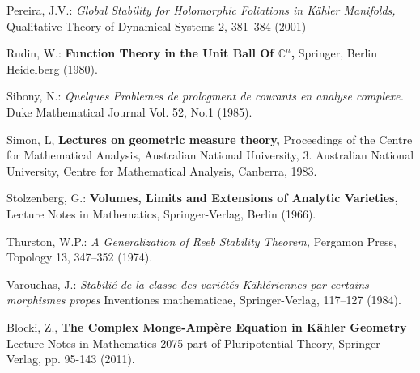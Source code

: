 \documentclass[12pt,twoside,a4paper]{report}
\newcommand{\co}{\ensuremath{\mathbb C }}
\begin{document}
 Pereira, J.V.: {\it Global Stability for Holomorphic Foliations in
Kähler Manifolds,} Qualitative Theory of Dynamical Systems 2, 381--384 (2001)

 Rudin, W.: {\bf Function Theory in the Unit Ball Of $\co^n$,} Springer, Berlin Heidelberg (1980).

 Sibony, N.: {\it Quelques Problemes de prologment de courants en analyse complexe.} Duke Mathematical Journal Vol. 52, No.1 (1985).

 Simon, L, {\bf Lectures on geometric measure theory,} Proceedings of the Centre for Mathematical Analysis, Australian National University, 3. Australian National University, Centre for Mathematical Analysis, Canberra, 1983.

 Stolzenberg, G.: {\bf Volumes, Limits and Extensions of Analytic Varieties,} Lecture Notes in
Mathematics, Springer-Verlag, Berlin (1966).

 Thurston, W.P.: {\it A Generalization of Reeb Stability Theorem,} Pergamon Press, Topology 13, 347--352 (1974).

 Varouchas, J.: {\it Stabilié de la classe des variétés Kählériennes par certains morphismes propes} Inventiones mathematicae, Springer-Verlag, 117--127 (1984).

 Blocki, Z., {\bf The Complex Monge-Amp\`ere Equation in K\"ahler Geometry} Lecture Notes in Mathematics 2075 part of Pluripotential Theory, Springer-Verlag, pp. 95-143 (2011).
\endthebibliography
\end{document}
